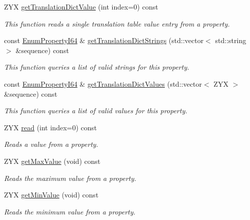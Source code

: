 \begin{DoxyCompactItemize}
Z\+Y\+X \hyperlink{classmv_i_m_p_a_c_t_1_1acquire_1_1_enum_property_i64_a822c1d7a48fb94c5f91b916b9701f183}{get\+Translation\+Dict\+Value} (int index=0) const 
\begin{DoxyCompactList}\small\item\em This function reads a single translation table value entry from a property. \end{DoxyCompactList}\item 
const \hyperlink{classmv_i_m_p_a_c_t_1_1acquire_1_1_enum_property_i64}{Enum\+Property\+I64} \& \hyperlink{classmv_i_m_p_a_c_t_1_1acquire_1_1_enum_property_i64_a4d5d7776137b9af3ad2a70b2d446b849}{get\+Translation\+Dict\+Strings} (std\+::vector$<$ std\+::string $>$ \&sequence) const 
\begin{DoxyCompactList}\small\item\em This function queries a list of valid strings for this property. \end{DoxyCompactList}\item 
const \hyperlink{classmv_i_m_p_a_c_t_1_1acquire_1_1_enum_property_i64}{Enum\+Property\+I64} \& \hyperlink{classmv_i_m_p_a_c_t_1_1acquire_1_1_enum_property_i64_a5c5487b00e5c5cd9ff03829ed73ffe38}{get\+Translation\+Dict\+Values} (std\+::vector$<$ Z\+Y\+X $>$ \&sequence) const 
\begin{DoxyCompactList}\small\item\em This function queries a list of valid values for this property. \end{DoxyCompactList}\item 
Z\+Y\+X \hyperlink{classmv_i_m_p_a_c_t_1_1acquire_1_1_enum_property_i64_aa9ee83a5b6b5243f05a85a769ef3d3f3}{read} (int index=0) const 
\begin{DoxyCompactList}\small\item\em Reads a value from a property. \end{DoxyCompactList}\item 
Z\+Y\+X \hyperlink{classmv_i_m_p_a_c_t_1_1acquire_1_1_enum_property_i64_aec8c49f90f853f085444f0167385b3b5}{get\+Max\+Value} (void) const 
\begin{DoxyCompactList}\small\item\em Reads the maximum value from a property. \end{DoxyCompactList}\item 
Z\+Y\+X \hyperlink{classmv_i_m_p_a_c_t_1_1acquire_1_1_enum_property_i64_a56c0ab40250e57d5883e065a8be809b9}{get\+Min\+Value} (void) const 
\begin{DoxyCompactList}\small\item\em Reads the minimum value from a property. \end{DoxyCompactList}\item 

\end{DoxyCompactItemize}
